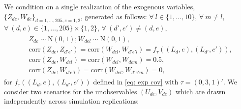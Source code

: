 \documentclass[preprint]{imsart}
\numberwithin{equation}{section}
\theoremstyle{plain}
\theoremstyle{definition}
\renewcommand{\(}{\left(}
\renewcommand{\)}{\right)}
\renewcommand{\[}{\left[}
\renewcommand{\]}{\right]}
\begin{document}
We condition on a single realization of the exogenous variables, $\{Z_{de},W_{de} \}_{d=1,...,205, e=1,2}$, generated as follows: 
$\forall \ l\in \{ 1,\dots, 10\}$, $\forall \ m\ne l$,  $\forall \ (d,e)\in \{1,\dots,205 \}\times \{1,2\}$, $\forall \ (d',e')\ne (d,e)$,
\begin{align}\begin{split}
	&Z_{de}\sim \mathrm N(0,1); W_{del}\sim \mathrm N(0,1),\\
	&\mathrm{corr}(Z_{de},Z_{d'e'})=\mathrm{corr}(W_{del},W_{d'e'l})=f_{\tau}( (L_d,e),(L_{d'},e')),\\
	&\mathrm{corr}(Z_{de},W_{del})=\mathrm{corr}(W_{del},W_{dem})=0.5,\\
	& \mathrm{corr}(Z_{de},W_{d'e'l})=\mathrm{corr}(W_{del},W_{d'e'm})=0,
\end{split}\end{align}
for $f_{\tau}( (L_d,e),(L_{d'},e'))$ defined in \eqref{eq: exp cov} with $\tau = (0,3,1)'$. %
We consider two scenarios for the unobservables $(U_{de},V_{de})$ which are drawn independently across simulation replications:
\end{document}
